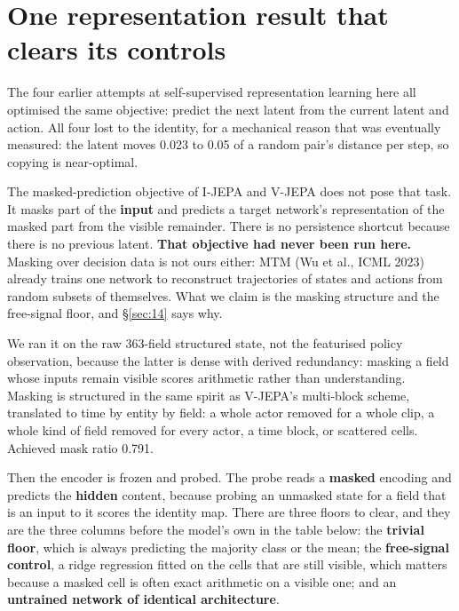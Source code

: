 \documentclass[11pt]{article}
\begin{document}
\section{One representation result that clears its controls}
\label{sec:8}

The four earlier attempts at self-supervised representation learning here all optimised the same objective: predict the next latent from the current latent and action. All four lost to the identity, for a mechanical reason that was eventually measured: the latent moves 0.023 to 0.05 of a random pair's distance per step, so copying is near-optimal.

The masked-prediction objective of I-JEPA \cite{assran2023ijepa} and V-JEPA \cite{bardes2024vjepa} does not pose that task. It masks part of the \textbf{input} and predicts a target network's representation of the masked part from the visible remainder. There is no persistence shortcut because there is no previous latent. \textbf{That objective had never been run here.} Masking over decision data is not ours either: MTM (Wu et al., ICML 2023) already trains one network to reconstruct trajectories of states and actions from random subsets of themselves. What we claim is the masking structure and the free-signal floor, and \S\ref{sec:14} says why.

We ran it on the raw 363-field structured state, not the featurised policy observation, because the latter is dense with derived redundancy: masking a field whose inputs remain visible scores arithmetic rather than understanding. Masking is structured in the same spirit as V-JEPA's multi-block scheme, translated to time by entity by field: a whole actor removed for a whole clip, a whole kind of field removed for every actor, a time block, or scattered cells. Achieved mask ratio 0.791.

Then the encoder is frozen and probed. The probe reads a \textbf{masked} encoding and predicts the \textbf{hidden} content, because probing an unmasked state for a field that is an input to it scores the identity map. There are three floors to clear, and they are the three columns before the model's own in the table below: the \textbf{trivial floor}, which is always predicting the majority class or the mean; the \textbf{free-signal control}, a ridge regression fitted on the cells that are still visible, which matters because a masked cell is often exact arithmetic on a visible one; and an \textbf{untrained network of identical architecture}.
\end{document}
